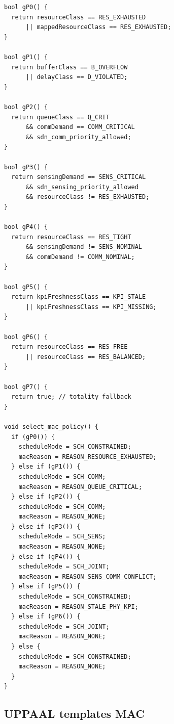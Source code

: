 \documentclass[10pt,a4paper]{article}
\begin{document}
\begin{verbatim}
bool gP0() {
  return resourceClass == RES_EXHAUSTED
      || mappedResourceClass == RES_EXHAUSTED;
}

bool gP1() {
  return bufferClass == B_OVERFLOW
      || delayClass == D_VIOLATED;
}

bool gP2() {
  return queueClass == Q_CRIT
      && commDemand == COMM_CRITICAL
      && sdn_comm_priority_allowed;
}

bool gP3() {
  return sensingDemand == SENS_CRITICAL
      && sdn_sensing_priority_allowed
      && resourceClass != RES_EXHAUSTED;
}

bool gP4() {
  return resourceClass == RES_TIGHT
      && sensingDemand != SENS_NOMINAL
      && commDemand != COMM_NOMINAL;
}

bool gP5() {
  return kpiFreshnessClass == KPI_STALE
      || kpiFreshnessClass == KPI_MISSING;
}

bool gP6() {
  return resourceClass == RES_FREE
      || resourceClass == RES_BALANCED;
}

bool gP7() {
  return true; // totality fallback
}

void select_mac_policy() {
  if (gP0()) {
    scheduleMode = SCH_CONSTRAINED;
    macReason = REASON_RESOURCE_EXHAUSTED;
  } else if (gP1()) {
    scheduleMode = SCH_COMM;
    macReason = REASON_QUEUE_CRITICAL;
  } else if (gP2()) {
    scheduleMode = SCH_COMM;
    macReason = REASON_NONE;
  } else if (gP3()) {
    scheduleMode = SCH_SENS;
    macReason = REASON_NONE;
  } else if (gP4()) {
    scheduleMode = SCH_JOINT;
    macReason = REASON_SENS_COMM_CONFLICT;
  } else if (gP5()) {
    scheduleMode = SCH_CONSTRAINED;
    macReason = REASON_STALE_PHY_KPI;
  } else if (gP6()) {
    scheduleMode = SCH_JOINT;
    macReason = REASON_NONE;
  } else {
    scheduleMode = SCH_CONSTRAINED;
    macReason = REASON_NONE;
  }
}
\end{verbatim}

\subsection{UPPAAL templates MAC}
\end{document}
